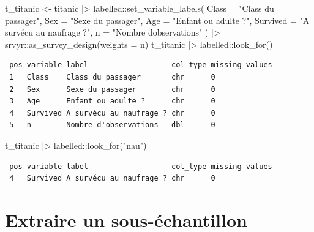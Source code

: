 \documentclass[
  letterpaper,
  DIV=11,
  numbers=noendperiod,
  oneside]{scrreprt}
\newenvironment{Shaded}{\begin{snugshade}}{\end{snugshade}}
\newcommand{\AttributeTok}[1]{\textcolor[rgb]{0.40,0.45,0.13}{#1}}
\newcommand{\FunctionTok}[1]{\textcolor[rgb]{0.28,0.35,0.67}{#1}}
\newcommand{\NormalTok}[1]{\textcolor[rgb]{0.00,0.23,0.31}{#1}}
\newcommand{\OtherTok}[1]{\textcolor[rgb]{0.00,0.23,0.31}{#1}}
\newcommand{\SpecialCharTok}[1]{\textcolor[rgb]{0.37,0.37,0.37}{#1}}
\newcommand{\StringTok}[1]{\textcolor[rgb]{0.13,0.47,0.30}{#1}}
\begin{document}
\begin{Shaded}
\begin{Highlighting}[]
\NormalTok{t\_titanic }\OtherTok{\textless{}{-}}\NormalTok{ titanic }\SpecialCharTok{|\textgreater{}} 
\NormalTok{  labelled}\SpecialCharTok{::}\FunctionTok{set\_variable\_labels}\NormalTok{(}
    \AttributeTok{Class =} \StringTok{"Class du passager"}\NormalTok{,}
    \AttributeTok{Sex =} \StringTok{"Sexe du passager"}\NormalTok{,}
    \AttributeTok{Age =} \StringTok{"Enfant ou adulte ?"}\NormalTok{,}
    \AttributeTok{Survived =} \StringTok{"A survécu au naufrage ?"}\NormalTok{,}
    \AttributeTok{n =} \StringTok{"Nombre d\textquotesingle{}observations"}
\NormalTok{  ) }\SpecialCharTok{|\textgreater{}} 
\NormalTok{  srvyr}\SpecialCharTok{::}\FunctionTok{as\_survey\_design}\NormalTok{(}\AttributeTok{weights =}\NormalTok{ n)}
\NormalTok{t\_titanic }\SpecialCharTok{|\textgreater{}}\NormalTok{ labelled}\SpecialCharTok{::}\FunctionTok{look\_for}\NormalTok{()}
\end{Highlighting}
\end{Shaded}

\begin{verbatim}
 pos variable label                   col_type missing values
 1   Class    Class du passager       chr      0             
 2   Sex      Sexe du passager        chr      0             
 3   Age      Enfant ou adulte ?      chr      0             
 4   Survived A survécu au naufrage ? chr      0             
 5   n        Nombre d'observations   dbl      0             
\end{verbatim}

\begin{Shaded}
\begin{Highlighting}[]
\NormalTok{t\_titanic }\SpecialCharTok{|\textgreater{}}\NormalTok{ labelled}\SpecialCharTok{::}\FunctionTok{look\_for}\NormalTok{(}\StringTok{"nau"}\NormalTok{)}
\end{Highlighting}
\end{Shaded}

\begin{verbatim}
 pos variable label                   col_type missing values
 4   Survived A survécu au naufrage ? chr      0             
\end{verbatim}

\hypertarget{extraire-un-sous-uxe9chantillon}{%
\section{Extraire un
sous-échantillon}\label{extraire-un-sous-uxe9chantillon}}
\end{document}
